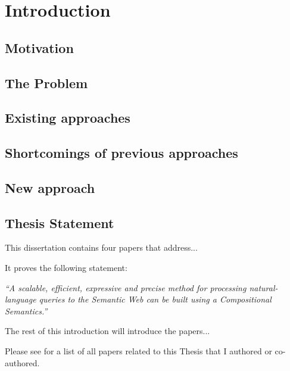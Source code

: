 \documentclass[../main.tex]{subfiles}
\begin{document}
\chapter{Introduction}

\label{chapter:intro}


\section{Motivation}


\section {The Problem}




\section {Existing approaches}



\section {Shortcomings of previous approaches}


\section {New approach}


\section{Thesis Statement}

This dissertation contains four papers that address...

It proves the following statement:

\textit{``A scalable, efficient, expressive and precise method for processing natural-language queries to the Semantic Web can be built using a Compositional Semantics.''}

The rest of this introduction will introduce the papers...

Please see  for a list of all papers related to this Thesis that I authored or co-authored.
\end{document}
